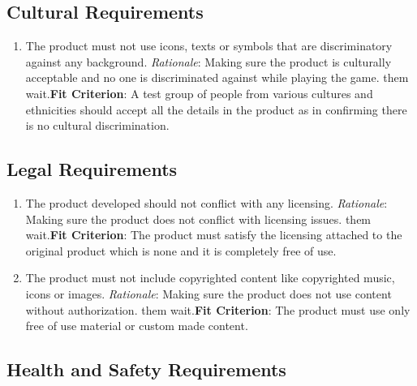 \documentclass[12pt, titlepage]{article}
\begin{document}
\subsection{Cultural Requirements}

\begin{enumerate}[{NFR}7.]
	\item  The product must not use icons, texts or symbols that are discriminatory against any background. 
	\newline \emph{Rationale}: Making sure the product is culturally acceptable and no one is discriminated against while playing the game.
	them wait.\newline \textbf{Fit Criterion}: A test group of people from various cultures and ethnicities should accept all the details in the product as in confirming there is no cultural discrimination.
\end{enumerate}

\subsection{Legal Requirements}

\begin{enumerate}[{NFR8}.1]
	\item  The product developed should not conflict with any licensing.
	\newline \emph{Rationale}: Making sure the product does not conflict with licensing issues.
	them wait.\newline \textbf{Fit Criterion}: The product must satisfy the licensing attached to the original product which is none and it is completely free of use.
	
	\item The product must not include copyrighted content like copyrighted music, icons or images. 
	\newline \emph{Rationale}: Making sure the product does not use content without authorization.
	them wait.\newline \textbf{Fit Criterion}: The product must use only free of use material or custom made content.
\end{enumerate}

\subsection{Health and Safety Requirements}
\end{document}
